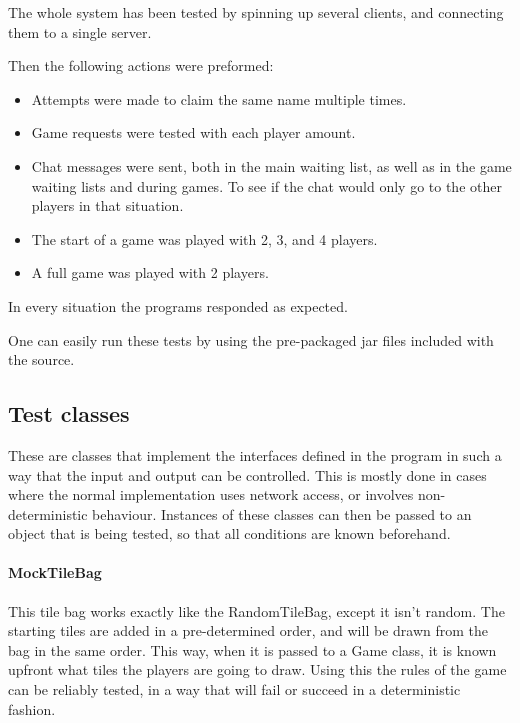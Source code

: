 \documentclass[12pt, letterpaper]{article}
\begin{document}
    The whole system has been tested by spinning up several clients, and connecting them to a single server.

    Then the following actions were preformed:

    \begin{itemize}
        \item Attempts were made to claim the same name multiple times.
        \item Game requests were tested with each player amount.
        \item Chat messages were sent, both in the main waiting list,
        as well as in the game waiting lists and during games.
        To see if the chat would only go to the other players in that situation.
        \item The start of a game was played with 2, 3, and 4 players.
        \item A full game was played with 2 players.
    \end{itemize}

    In every situation the programs responded as expected.

    One can easily run these tests by using the pre-packaged jar files included with the source.



    \subsection{Test classes}
    \label{subsec:testClasses}

    These are classes that implement the interfaces defined in the program in such a way that the input and output can
    be controlled.
    This is mostly done in cases where the normal implementation uses network access, or involves non-deterministic
    behaviour.
    Instances of these classes can then be passed to an object that is being tested, so that all conditions are known
    beforehand.

    \paragraph{MockTileBag}
    This tile bag works exactly like the RandomTileBag, except it isn't random.
    The starting tiles are added in a pre-determined order, and will be drawn from the bag in the same order.
    This way, when it is passed to a Game class, it is known upfront what tiles the players are going to draw.
    Using this the rules of the game can be reliably tested, in a way that will fail or succeed in a deterministic
    fashion.
\end{document}

